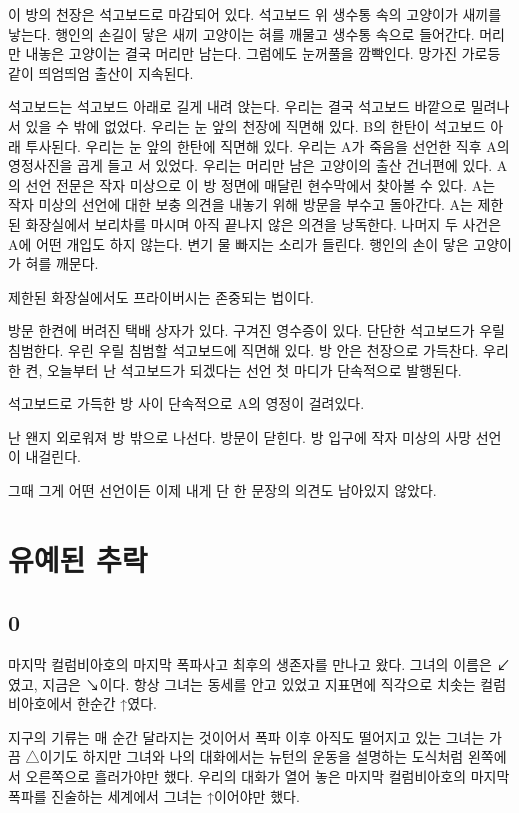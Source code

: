 \documentclass[a5paper,10pt, twoside, openright]{memoir}
\begin{document}
	이 방의 천장은 석고보드로 마감되어 있다. 석고보드 위 생수통 속의 고양이가 새끼를 낳는다. 행인의 손길이 닿은 새끼 고양이는 혀를 깨물고 생수통 속으로 들어간다. 머리만 내놓은 고양이는 결국 머리만 남는다. 그럼에도 눈꺼풀을 깜빡인다. 망가진 가로등 같이 띄엄띄엄 출산이 지속된다. 

	석고보드는 석고보드 아래로 길게 내려 앉는다. 우리는 결국 석고보드 바깥으로 밀려나 서 있을 수 밖에 없었다. 우리는 눈 앞의 천장에 직면해 있다. B의 한탄이 석고보드 아래 투사된다. 우리는 눈 앞의 한탄에 직면해 있다. 우리는 A가 죽음을 선언한 직후 A의 영정사진을 곱게 들고 서 있었다. 우리는 머리만 남은 고양이의 출산 건너편에 있다. A의 선언 전문은 작자 미상으로 이 방 정면에 매달린 현수막에서 찾아볼 수 있다. A는 작자 미상의 선언에 대한 보충 의견을 내놓기 위해 방문을 부수고 돌아간다. A는 제한된 화장실에서 보리차를 마시며 아직 끝나지 않은 의견을 낭독한다. 나머지 두 사건은 A에 어떤 개입도 하지 않는다. 변기 물 빠지는 소리가 들린다. 행인의 손이 닿은 고양이가 혀를 깨문다. 

	제한된 화장실에서도 프라이버시는 존중되는 법이다. 

	방문 한켠에 버려진 택배 상자가 있다. 구겨진 영수증이 있다. 단단한 석고보드가 우릴 침범한다. 우린 우릴 침범할 석고보드에 직면해 있다. 방 안은 천장으로 가득찬다. 우리 한 켠, 오늘부터 난 석고보드가 되겠다는 선언 첫 마디가 단속적으로 발행된다. 

	석고보드로 가득한 방 사이 단속적으로 A의 영정이 걸려있다. 

	난 왠지 외로워져 방 밖으로 나선다. 방문이 닫힌다. 방 입구에 작자 미상의 사망 선언이 내걸린다. 

	그때 그게 어떤 선언이든 이제 내게 단 한 문장의 의견도 남아있지 않았다. 

			\chapter{유예된 추락}
				\section{0}
	마지막 컬럼비아호의 마지막 폭파사고 최후의 생존자를 만나고 왔다. 그녀의 이름은 ↙였고, 지금은 ↘이다. 항상 그녀는 동세를 안고 있었고 지표면에 직각으로 치솟는 컬럼비아호에서 한순간 ↑였다.

	지구의 기류는 매 순간 달라지는 것이어서 폭파 이후 아직도 떨어지고 있는 그녀는 가끔 △이기도 하지만 그녀와 나의 대화에서는 뉴턴의 운동을 설명하는 도식처럼 왼쪽에서 오른쪽으로 흘러가야만 했다. 우리의 대화가 열어 놓은 마지막 컬럼비아호의 마지막 폭파를 진술하는 세계에서 그녀는 ↑이어야만 했다.
\end{document}
